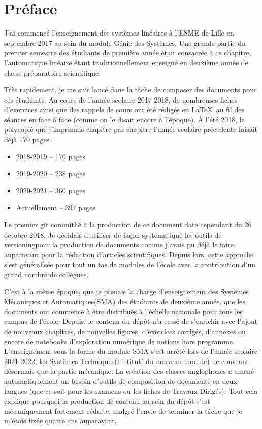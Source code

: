 \chapter*{Préface}
\thispagestyle{plain}
J'ai commencé l'enseignement des systèmes linéaires 
à l'ESME de Lille en septembre 2017 au sein du module \og Génie des Systèmes\fg.
Une grande partie du premier semestre des étudiants de première année
était consacrée à ce chapitre, l'automatique linéaire étant traditionnellement
enseigné en deuxième année de classe préparatoire scientifique.

Très rapidement, je me suis lancé dans la tâche
de composer des documents pour ces étudiants.
Au cours de l'année scolaire 2017-2018, de nombreuses fiches
d'exercices ainsi que des rappels de cours ont été rédigés en \LaTeX~au
fil des séances en face à face (comme on le disait encore à l'époque). 
À l'été 2018, le polycopié que j'imprimais
chapitre par chapitre l'année scolaire précédente faisait déjà 170 pages.
\begin{itemize}
    \item 2018-2019 -- 170 pages
    \item 2019-2020 -- 238 pages
    \item 2020-2021 -- 360 pages
    \item Actuellement -- 397 pages
\end{itemize}
Le premier \og git commit\fg lié à la production de ce document date
cependant du 26 octobre 2018. Je décidais d'utiliser de façon systématique
les outils de \og versioning\fg pour la production de documents
comme j'avais pu déjà le faire auparavant pour la rédaction
d'articles scientifiques. Depuis lors, cette approche s'est généralisée pour tout un
tas de modules de l'école avec la contribution d'un grand nombre de collègues.
\newline

C'est à la même époque, que je prenais la charge d'enseignement des 
\og Systèmes Mécaniques et Automatiques\fg (SMA)
des étudiants de deuxième année, que les documents ont commencé à être distribués
à l'échelle nationale pour tous les campus de l'école.
Depuis, le contenu du dépôt n'a cessé de s'enrichir avec l'ajout
de nouveaux chapitres, de nouvelles figures, d'exercices corrigés, d'annexes
ou encore de notebooks d'exploration numérique de notions hors programme.
L'enseignement sous la forme du module SMA s'est arrêté lors de l'année
scolaire 2021-2022, les \og Systèmes Techniques\fg (l'intitulé du
nouveau module) ne couvrant désormais que la partie mécanique.
La création des classes anglophones a amené automatiquement un besoin
d'outils de composition de documents en deux langues (que ce soit pour les examens
ou les fiches de \og Travaux Dirigés\fg). Tout cela explique pourquoi la production
de contenu au sein du dépôt s'est mécaniquement fortement réduite,
malgré l'envie de terminer la tâche que je m'étais fixée quatre ans auparavant.

